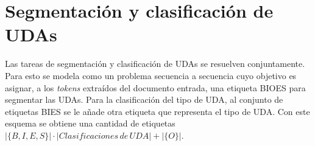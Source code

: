 \documentclass[a4paper,11pt,twocolumn,twoside]{article}
\begin{document}


\section{Segmentación y clasificación de UDAs}

Las tareas de segmentación y clasificación de UDAs se resuelven conjuntamente. Para esto se modela 
como un problema secuencia a secuencia cuyo objetivo es asignar, a los \textit{tokens} extraídos del documento 
entrada, una etiqueta BIOES para segmentar las UDAs. Para la clasificación del tipo 
de UDA, al conjunto de etiquetas BIES se le añade otra etiqueta que representa el tipo de UDA. Con 
este esquema se obtiene una cantidad de etiquetas $|\{B,I,E,S\}| \cdot |Clasificaciones \, de \, UDA| + |\{O\}|$.

\end{document}
